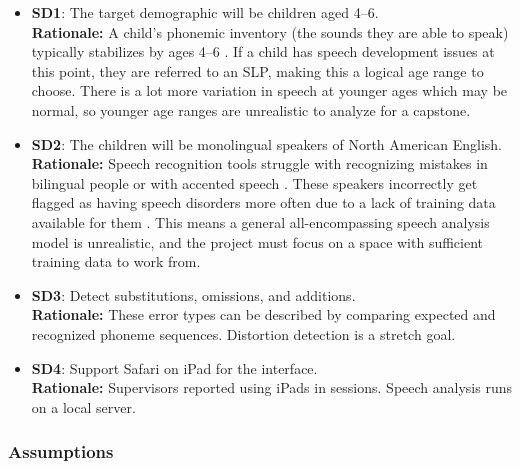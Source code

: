 \documentclass[12pt]{article}
\begin{document}
\begin{itemize}
    \item \textbf{SD1}: The target demographic will be children aged 4--6.\\
    \textbf{Rationale:} A child’s phonemic inventory (the sounds they are able to speak) typically stabilizes by ages 4--6 \cite{kid_sense_dev}. If a child has speech development issues at this point, they are referred to an SLP, making this a logical age range to choose. There is a lot more variation in speech at younger ages which may be normal, so younger age ranges are unrealistic to analyze for a capstone.

    \item \textbf{SD2}: The children will be monolingual speakers of North American English.\\
    \textbf{Rationale:} Speech recognition tools struggle with recognizing mistakes in bilingual people or with accented speech \cite{bias_accented_speech}. These speakers incorrectly get flagged as having speech disorders more often due to a lack of training data available for them \cite{bias_accented_speech}. This means a general all-encompassing speech analysis model is unrealistic, and the project must focus on a space with sufficient training data to work from.

    \item \textbf{SD3}: Detect substitutions, omissions, and additions.\\
    \textbf{Rationale:} These error types can be described by comparing expected and recognized phoneme sequences. Distortion detection is a stretch goal.

    \item \textbf{SD4}: Support Safari on iPad for the interface.\\
    \textbf{Rationale:} Supervisors reported using iPads in sessions. Speech analysis runs on a local server.
\end{itemize}

\subsubsection{Assumptions}
\end{document}
